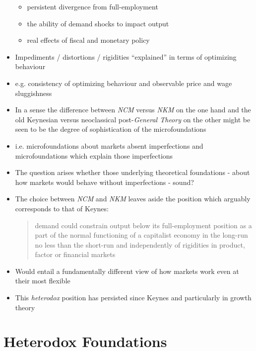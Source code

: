 \documentclass{article}
\begin{document}
\begin{itemize}
\begin{itemize}
			\item persistent divergence from full-employment 
			\item the ability of demand shocks to impact output 
			\item real effects of fiscal and monetary policy
		\end{itemize}
		\item Impediments / distortions / rigidities ``explained'' in terms of optimizing behaviour
		\item e.g. consistency of optimizing behaviour and observable price and wage sluggishness
		\item In a sense the difference between \textit{NCM} versus \textit{NKM} on the one hand and the old Keynesian versus neoclassical post-\textit{General Theory} on the other might be seen to be the degree of sophistication of the microfoundations 
		\item i.e. microfoundations about markets absent imperfections and microfoundations which explain those imperfections
		\item The question arises whether those underlying theoretical foundations - about how markets would behave without imperfections - sound?
		\item The choice between \textit{NCM} and \textit{NKM} leaves aside the position which arguably corresponds to that of Keynes:
		\begin{quote}
			demand could constrain output below its full-employment position as a part of the normal functioning of a capitalist economy in the long-run no less than the short-run and independently of rigidities in product, factor or financial markets
		\end{quote}
		\item Would entail a fundamentally different view of how markets work even at their most flexible
		\item This \textit{heterodox} position has persisted since Keynes and particularly in growth theory
	\end{itemize}

\section{Heterodox Foundations}
\end{document}
